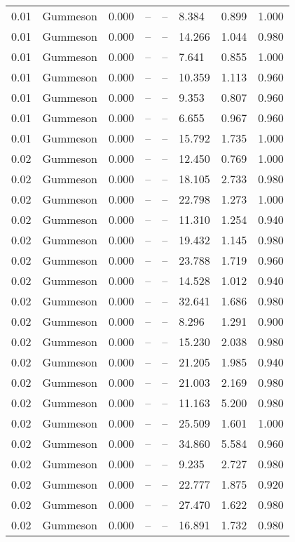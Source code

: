 \begin{table}[H]
\begin{tabular}{l c l l l}
0.01 & Gummeson & 0.000 & -- & -- & 8.384 & 0.899 & 1.000 \\
0.01 & Gummeson & 0.000 & -- & -- & 14.266 & 1.044 & 0.980 \\
0.01 & Gummeson & 0.000 & -- & -- & 7.641 & 0.855 & 1.000 \\
0.01 & Gummeson & 0.000 & -- & -- & 10.359 & 1.113 & 0.960 \\
0.01 & Gummeson & 0.000 & -- & -- & 9.353 & 0.807 & 0.960 \\
0.01 & Gummeson & 0.000 & -- & -- & 6.655 & 0.967 & 0.960 \\
0.01 & Gummeson & 0.000 & -- & -- & 15.792 & 1.735 & 1.000 \\
0.02 & Gummeson & 0.000 & -- & -- & 12.450 & 0.769 & 1.000 \\
0.02 & Gummeson & 0.000 & -- & -- & 18.105 & 2.733 & 0.980 \\
0.02 & Gummeson & 0.000 & -- & -- & 22.798 & 1.273 & 1.000 \\
0.02 & Gummeson & 0.000 & -- & -- & 11.310 & 1.254 & 0.940 \\
0.02 & Gummeson & 0.000 & -- & -- & 19.432 & 1.145 & 0.980 \\
0.02 & Gummeson & 0.000 & -- & -- & 23.788 & 1.719 & 0.960 \\
0.02 & Gummeson & 0.000 & -- & -- & 14.528 & 1.012 & 0.940 \\
0.02 & Gummeson & 0.000 & -- & -- & 32.641 & 1.686 & 0.980 \\
0.02 & Gummeson & 0.000 & -- & -- & 8.296 & 1.291 & 0.900 \\
0.02 & Gummeson & 0.000 & -- & -- & 15.230 & 2.038 & 0.980 \\
0.02 & Gummeson & 0.000 & -- & -- & 21.205 & 1.985 & 0.940 \\
0.02 & Gummeson & 0.000 & -- & -- & 21.003 & 2.169 & 0.980 \\
0.02 & Gummeson & 0.000 & -- & -- & 11.163 & 5.200 & 0.980 \\
0.02 & Gummeson & 0.000 & -- & -- & 25.509 & 1.601 & 1.000 \\
0.02 & Gummeson & 0.000 & -- & -- & 34.860 & 5.584 & 0.960 \\
0.02 & Gummeson & 0.000 & -- & -- & 9.235 & 2.727 & 0.980 \\
0.02 & Gummeson & 0.000 & -- & -- & 22.777 & 1.875 & 0.920 \\
0.02 & Gummeson & 0.000 & -- & -- & 27.470 & 1.622 & 0.980 \\
0.02 & Gummeson & 0.000 & -- & -- & 16.891 & 1.732 & 0.980 \\

\end{tabular}
\end{table}
